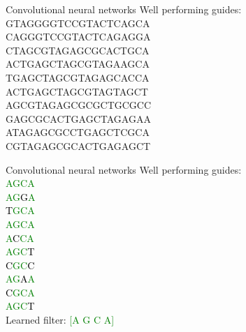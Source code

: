 \documentclass[Nike]{tuberlinbeamer}
\begin{document}


\begin{frame}{Convolutional neural networks}
  Well performing guides: \\
  {\large
    GTAGGGGTCCGTACTCAGCA \\
    CAGGGTCCGTACTCAGAGGA \\
    CTAGCGTAGAGCGCACTGCA \\
    ACTGAGCTAGCGTAGAAGCA \\
    TGAGCTAGCGTAGAGCACCA \\
    ACTGAGCTAGCGTAGTAGCT \\
    AGCGTAGAGCGCGCTGCGCC \\
    GAGCGCACTGAGCTAGAGAA \\
    ATAGAGCGCCTGAGCTCGCA \\
    CGTAGAGCGCACTGAGAGCT \\
  }
\end{frame}

\begin{frame}{Convolutional neural networks}
  Well performing guides: \\
  \textcolor{green}{\large
    AGCA \\
    AG{\textcolor{black}G}A \\
    {\textcolor{black}T}GCA \\
    AGCA \\
    A{\textcolor{black}C}CA \\
    AGC{\textcolor{black}T} \\
    {\textcolor{black}C}GC{\textcolor{black}C} \\
    AG{\textcolor{black}A}A \\
    {\textcolor{black}C}GCA \\
    AGC{\textcolor{black}T} \\
  }
  \pause
  Learned filter: \textcolor{green}{[A G C A]}
\end{frame}
\end{document}
